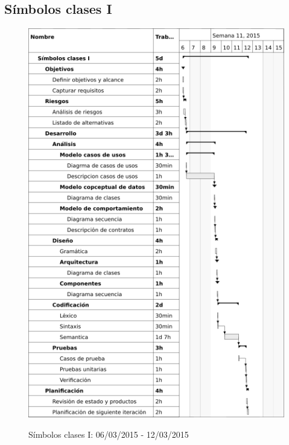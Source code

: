 \subsection{Símbolos clases I}
\begin{center}
\begin{figure}[H]
\centering
\includegraphics[scale=1]{planning/15-simbolos-clases-i.png} \\
\caption{Símbolos clases I: 06/03/2015 - 12/03/2015 }
\end{figure}
\end{center}


